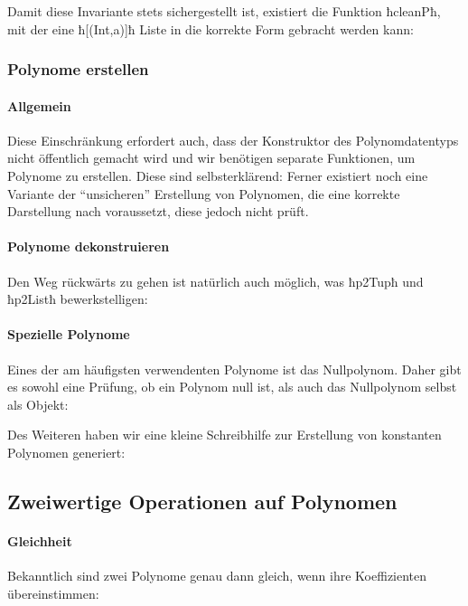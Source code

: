 Damit diese Invariante stets sichergestellt ist, existiert die Funktion
ħcleanPħ, mit der eine ħ[(Int,a)]ħ Liste in die korrekte Form gebracht werden
kann:


\subsubsection{Polynome erstellen}
\paragraph{Allgemein}
Diese Einschränkung erfordert auch, dass der Konstruktor des Polynomdatentyps
nicht öffentlich gemacht wird und wir benötigen separate Funktionen, um
Polynome zu erstellen. Diese sind selbsterklärend:
Ferner existiert noch eine Variante der ``unsicheren'' Erstellung von
Polynomen, die eine korrekte Darstellung nach  voraussetzt,
diese jedoch nicht prüft. 


\paragraph{Polynome dekonstruieren}
Den Weg rückwärts zu gehen ist natürlich auch möglich, was ħp2Tupħ und ħp2Listħ
bewerkstelligen:



\paragraph{Spezielle Polynome}
Eines der am häufigsten verwendenten Polynome ist das Nullpolynom. Daher gibt
es sowohl eine Prüfung, ob ein Polynom null ist, als auch das Nullpolynom
selbst als Objekt:


Des Weiteren haben wir eine kleine Schreibhilfe zur Erstellung von konstanten
Polynomen generiert:



\subsection{Zweiwertige Operationen auf Polynomen}
\paragraph{Gleichheit} Bekanntlich sind zwei Polynome 
genau dann gleich, wenn ihre Koeffizienten übereinstimmen:

